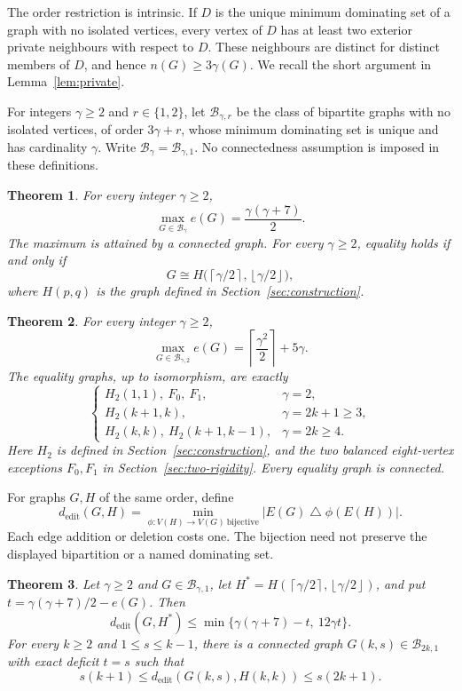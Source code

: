 \documentclass[11pt]{article}
\newtheorem{theorem}{Theorem}[section]
\theoremstyle{definition}
\theoremstyle{remark}
\newcommand{\e}{e}
\newcommand{\ceil}[1]{\left\lceil#1\right\rceil}
\newcommand{\floor}[1]{\left\lfloor#1\right\rfloor}
\begin{document}
The order restriction is intrinsic. If $D$ is the unique minimum dominating
set of a graph with no isolated vertices, every vertex of $D$ has at least two
exterior private neighbours with respect to $D$. These neighbours are distinct
for distinct members of $D$, and hence $n(G)\ge3\gamma(G)$. We recall the short
argument in Lemma~\ref{lem:private}.

For integers $\gamma\ge2$ and $r\in\{1,2\}$, let $\mathcal B_{\gamma,r}$ be the class of bipartite
graphs with no isolated vertices, of order $3\gamma+r$, whose minimum
dominating set is unique and has cardinality $\gamma$. Write
$\mathcal B_\gamma=\mathcal B_{\gamma,1}$. No connectedness assumption is
imposed in these definitions.

\begin{theorem}\label{thm:main}
For every integer $\gamma\ge2$,
\[
 \max_{G\in\mathcal B_\gamma}\e(G)=\frac{\gamma(\gamma+7)}2.
\]
The maximum is attained by a connected graph. For every $\gamma\ge2$, equality
holds if and only if
\[
 G\cong H\bigl(\ceil{\gamma/2},\floor{\gamma/2}\bigr),
\]
where $H(p,q)$ is the graph defined in Section~\ref{sec:construction}.
\end{theorem}

\begin{theorem}\label{thm:two}
For every integer $\gamma\ge2$,
\[
 \max_{G\in\mathcal B_{\gamma,2}}\e(G)
   =\ceil{\frac{\gamma^2}{2}}+5\gamma.
\]
The equality graphs, up to isomorphism, are exactly
\[
\begin{cases}
 H_2(1,1),\ F_0,\ F_1,&\gamma=2,\\
 H_2(k+1,k),&\gamma=2k+1\ge3,\\
 H_2(k,k),\ H_2(k+1,k-1),&\gamma=2k\ge4.
\end{cases}
\]
Here $H_2$ is defined in Section~\ref{sec:construction}, and the two
balanced eight-vertex exceptions $F_0,F_1$ in Section~\ref{sec:two-rigidity}.
Every equality graph is connected.
\end{theorem}

For graphs $G,H$ of the same order, define
\[
 d_{\mathrm{edit}}(G,H)
   =\min_{\phi:V(H)\to V(G)\ \mathrm{bijective}}
       |E(G)\mathbin{\triangle}\phi(E(H))|.
\]
Each edge addition or deletion costs one. The bijection need not preserve
the displayed bipartition or a named dominating set.

\begin{theorem}\label{thm:stability}
Let $\gamma\ge2$ and $G\in\mathcal B_{\gamma,1}$, let
$H^*=H(\ceil{\gamma/2},\floor{\gamma/2})$, and put
$t=\gamma(\gamma+7)/2-\e(G)$. Then
\[
 d_{\mathrm{edit}}(G,H^*)
 \le \min\{\gamma(\gamma+7)-t,\ 12\gamma t\}.
\]
For every $k\ge2$ and $1\le s\le k-1$, there is a connected graph
$G(k,s)\in\mathcal B_{2k,1}$ with exact deficit $t=s$ such that
\[
 s(k+1)\le d_{\mathrm{edit}}(G(k,s),H(k,k))\le s(2k+1).
\]
\end{theorem}
\end{document}
